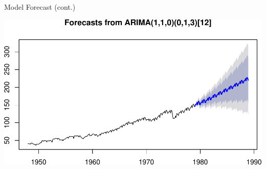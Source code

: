 \documentclass[11pt,ignorenonframetext,]{beamer}
\newenvironment{Shaded}{}{}
\newcommand{\DecValTok}[1]{\textcolor[rgb]{0.25,0.63,0.44}{#1}}
\newcommand{\FloatTok}[1]{\textcolor[rgb]{0.25,0.63,0.44}{#1}}
\newcommand{\KeywordTok}[1]{\textcolor[rgb]{0.00,0.44,0.13}{\textbf{#1}}}
\newcommand{\NormalTok}[1]{#1}
\newcommand{\OperatorTok}[1]{\textcolor[rgb]{0.40,0.40,0.40}{#1}}
\newcommand{\StringTok}[1]{\textcolor[rgb]{0.25,0.44,0.63}{#1}}
\let\oldShaded\Shaded
\let\endoldShaded\endShaded
\renewenvironment{Shaded}{\footnotesize\begin{spacing}{0.9}\oldShaded}{\endoldShaded\end{spacing}}
\begin{document}
\begin{frame}[fragile]{%
\protect\hypertarget{model-forecast-cont.-1}{%
Model Forecast (cont.)}}

\begin{Shaded}
\end{Shaded}

\begin{center}\includegraphics[width=\textwidth]{Lec11_files/figure-beamer/unnamed-chunk-31-1} \end{center}

\end{frame}
\end{document}
